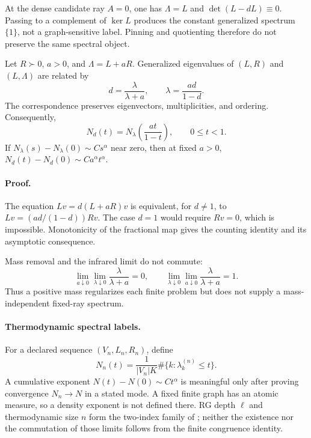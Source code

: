 At the dense candidate ray \(A=0\), one has \(\Lambda=L\) and
\(\det(L-dL)\equiv0\).  Passing to a complement of \(\ker L\) produces the
constant generalized spectrum \(\{1\}\), not a graph-sensitive label.
Pinning and quotienting therefore do not preserve the same spectral object.

Let \(R\succ0\), \(a>0\), and \(\Lambda=L+aR\).  Generalized eigenvalues of
\((L,R)\) and \((L,\Lambda)\) are related by
\begin{equation}
d=\frac{\lambda}{\lambda+a},
\qquad
\lambda=\frac{ad}{1-d}.
\label{eq:grg-mass-transfer}
\end{equation}
The correspondence preserves eigenvectors, multiplicities, and ordering.
Consequently,
\begin{equation}
N_d(t)=N_\lambda\left(\frac{at}{1-t}\right),
\qquad 0\leq t<1.
\label{eq:grg-counting-transfer}
\end{equation}
If \(N_\lambda(s)-N_\lambda(0)\sim Cs^\alpha\) near zero, then at fixed
\(a>0\),
\(N_d(t)-N_d(0)\sim Ca^\alpha t^\alpha\). 

\paragraph{Proof.}
The equation \(Lv=d(L+aR)v\) is equivalent, for \(d\ne1\), to
\(Lv=(ad/(1-d))Rv\).  The case \(d=1\) would require \(Rv=0\), which is
impossible.  Monotonicity of the fractional map gives the counting identity
and its asymptotic consequence.

Mass removal and the infrared limit do not commute:
\begin{equation}
\lim_{a\downarrow0}\lim_{\lambda\downarrow0}
\frac{\lambda}{\lambda+a}=0,
\qquad
\lim_{\lambda\downarrow0}\lim_{a\downarrow0}
\frac{\lambda}{\lambda+a}=1.
\label{eq:grg-noncommuting-mass}
\end{equation}
Thus a positive mass regularizes each finite problem but does not supply a
mass-independent fixed-ray spectrum.

\paragraph{Thermodynamic spectral labels.}
For a declared sequence \((V_n,L_n,R_n)\), define
\begin{equation}
N_n(t)
=\frac{1}{|V_n|K}
\#\{k:\lambda_k^{(n)}\leq t\}.
\label{eq:grg-ids}
\end{equation}
A cumulative exponent
\(N(t)-N(0)\sim Ct^\alpha\) is meaningful only after proving convergence
\(N_n\to N\) in a stated mode.  A fixed finite graph has an atomic measure,
so a density exponent is not defined there.  RG depth \(\ell\) and
thermodynamic size \(n\) form the two-index family of
; neither the existence nor the commutation of
those limits follows from the finite congruence identity. 

